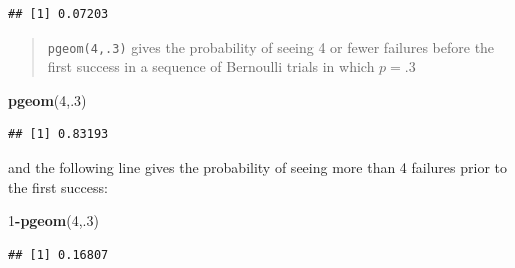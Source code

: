 \documentclass[
]{book}
\newenvironment{Shaded}{\begin{snugshade}}{\end{snugshade}}
\newcommand{\DecValTok}[1]{\textcolor[rgb]{0.00,0.00,0.81}{#1}}
\newcommand{\FunctionTok}[1]{\textcolor[rgb]{0.13,0.29,0.53}{\textbf{#1}}}
\newcommand{\NormalTok}[1]{#1}
\newcommand{\SpecialCharTok}[1]{\textcolor[rgb]{0.81,0.36,0.00}{\textbf{#1}}}
\theoremstyle{definition}
\theoremstyle{definition}
\theoremstyle{definition}
\theoremstyle{definition}
\theoremstyle{remark}
\begin{document}
\begin{verbatim}
## [1] 0.07203
\end{verbatim}

\begin{quote}
\texttt{pgeom(4,.3)} gives the probability of seeing 4 or fewer failures before the first success in a sequence of Bernoulli trials in which \(p = .3\)
\end{quote}

\begin{Shaded}
\begin{Highlighting}[]
\FunctionTok{pgeom}\NormalTok{(}\DecValTok{4}\NormalTok{,.}\DecValTok{3}\NormalTok{)}
\end{Highlighting}
\end{Shaded}

\begin{verbatim}
## [1] 0.83193
\end{verbatim}

and the following line gives the probability of seeing more than 4 failures prior to the first success:

\begin{Shaded}
\begin{Highlighting}[]
\DecValTok{1}\SpecialCharTok{{-}}\FunctionTok{pgeom}\NormalTok{(}\DecValTok{4}\NormalTok{,.}\DecValTok{3}\NormalTok{)}
\end{Highlighting}
\end{Shaded}

\begin{verbatim}
## [1] 0.16807
\end{verbatim}
\end{document}
